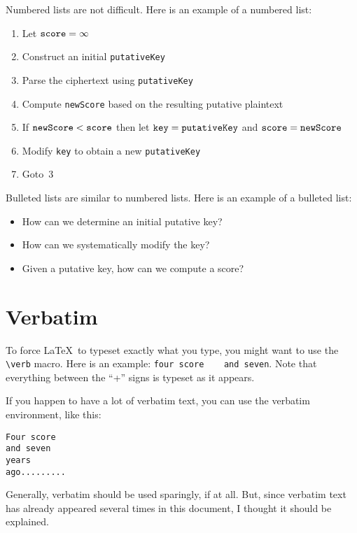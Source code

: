 Numbered lists are not difficult. Here is an example
of a numbered list:
\begin{enumerate}
\item Let $\mbox{\tt score} = \infty$
\item Construct an initial {\tt putativeKey} 
\item Parse the ciphertext using {\tt putativeKey}
\item Compute {\tt newScore} based on the resulting putative plaintext
\item If $\mbox{\tt newScore} < \mbox{\tt score}$ then 
let $\mbox{\tt key} = \mbox{\tt putativeKey}$ and $\mbox{\tt score} = \mbox{\tt newScore}$
\item Modify {\tt key} to obtain a new {\tt putativeKey}
\item Goto~3
\end{enumerate}

Bulleted lists are similar to numbered lists. Here is an example of a bulleted list:
\begin{itemize}
\item How can we determine an initial putative key?
\item  How can we systematically modify the key?
\item Given a putative key, how can we compute a score?
\end{itemize}


\section{Verbatim}

To force \LaTeX\ to typeset exactly what you type, you might want to use the \verb+\verb+
macro. Here is an example:
\verb+four score    and seven+. Note that everything between the ``+'' signs
is typeset as it appears. 

If you happen to have a lot of verbatim text, you can use the verbatim environment,
like this:

\begin{verbatim}
Four score
and seven
years
ago.........
\end{verbatim}

Generally, verbatim should be used sparingly, if at all. But, since
verbatim text has already appeared several times in this document, I thought it
should be explained.

